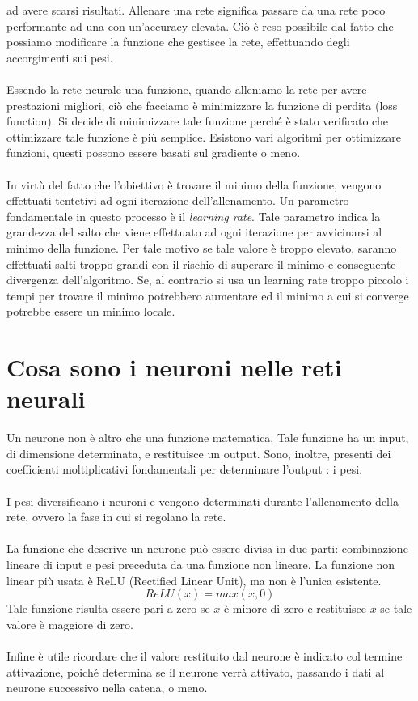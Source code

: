 ad avere scarsi risultati. Allenare una rete significa passare da una rete poco performante ad 
una con un'accuracy elevata. Ciò è reso possibile dal fatto che possiamo modificare la funzione 
che gestisce la rete, effettuando degli accorgimenti sui pesi.
\\\\
Essendo la rete neurale una funzione, quando alleniamo la rete per avere prestazioni migliori,
ciò che facciamo è minimizzare la funzione di perdita (loss function). Si decide di minimizzare tale 
funzione perché è stato verificato che ottimizzare tale funzione 
è più semplice. Esistono vari  algoritmi per ottimizzare funzioni, questi possono essere basati sul 
gradiente o meno.
\\\\
In virtù del fatto che l'obiettivo è trovare il minimo della funzione, vengono effettuati tentetivi
ad ogni iterazione dell'allenamento. Un parametro fondamentale in questo processo è il \emph{learning rate}.
Tale parametro indica la grandezza del salto che viene effettuato ad ogni iterazione per avvicinarsi al 
minimo della funzione. Per tale motivo se tale valore è troppo elevato, saranno effettuati salti 
troppo grandi con il rischio di superare il minimo e conseguente divergenza dell'algoritmo.
Se, al contrario si usa un learning rate troppo piccolo i tempi per trovare il minimo potrebbero aumentare 
ed il minimo a cui si converge potrebbe essere un minimo locale.

\section{Cosa sono i neuroni nelle reti neurali}
\label{neuroni}
Un neurone non è altro che una funzione matematica. Tale funzione ha un input, di dimensione 
determinata, e restituisce un output. Sono, inoltre, presenti 
dei coefficienti moltiplicativi fondamentali per determinare l'output : i pesi.
\\\\
I pesi diversificano i neuroni e vengono determinati durante l'allenamento della rete, ovvero la 
fase in cui si regolano la rete.
\\\\
La funzione che descrive un neurone può essere divisa in due parti: combinazione lineare di 
input e pesi preceduta da una funzione non lineare. La funzione non linear più usata è ReLU (Rectified 
Linear Unit), ma non è l'unica esistente.
\begin{equation*}
    ReLU(x)=max(x,0)
\end{equation*}
Tale funzione risulta essere pari a zero se $x$ è minore di zero e restituisce $x$ se tale valore 
è maggiore di zero.
\\\\
Infine è utile ricordare che il valore restituito dal neurone è indicato col termine attivazione, 
poiché determina se il neurone verrà attivato, passando i dati al neurone successivo nella catena, o meno.
